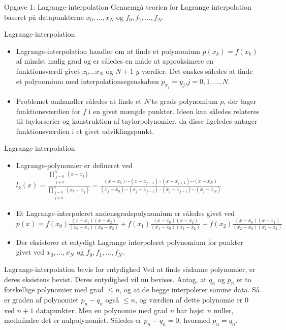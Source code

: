 \begin{frame}{Opgave 1: Lagrange-interpolation}
    Gennemgå teorien for Lagrange interpolation baseret på datapunkterne $x_0, \ldots, x_N$ og $f_0, f_1, \ldots , f_N$. 
\end{frame}

\begin{frame}{Lagrange-interpolation}
    \begin{itemize}
        \item Lagrange-interpolation handler om at finde et polynomium $p(x_k)=f(x_k)$ af mindst mulig grad og er således en måde at approksimere en funktionsværdi givet $x_0 \ldots x_N$ og $N+1 $  $y$ værdier.
        Det ønskes således at finde et polynomium med interpolationsegenskaben $p_{x_j}=y_j$,$j=0,1,\ldots,N$.

        \item Problemet omhandler således at finde et $N$'te grads polynomium $p$, der tager funktionsværdien for $f$ i en givet mængde punkter. 
        Ideen kan således relateres til taylorserier og konstruktion af taylorpolynomier, da disse ligeledes antager funktionsværdien i et givet udviklingspunkt.
    \end{itemize}
\end{frame}
\begin{frame}{Lagrange-interpolation}
    \begin{itemize}
        \item Lagrange-polynomier er defineret ved \\
            $
            l_k(x)=\frac{\prod_{\substack{j=0 \\ {j \neq k}}}^{N}(x-x_j)}{\prod_{\substack{j=0 \\ {j \neq k}}}^{N}(x_k-x_j)}=\frac{(x-x_0) \cdots (x-x_{j-1}) \cdot (x-x_{j+1})\cdots(x-x_N)}{(x_j-x_0)\cdots (x_j-x_{j-1}) \cdot (x_j-x_{j+1})\cdots (x_j - x_N)}
            $
        \item Et Lagrange-interpoleret andensgradspolynomium er således givet ved $ p(x)=f(x_0)\frac{(x-x_1)(x-x_2)}{(x_0-x_1)(x_0-x_2)}+f(x_1)\frac{(x-x_0)(x-x_2)}{(x_1-x_0)(x_1-x_2)}+f(x_2)\frac{(x-x_0)(x-x_1)}{(x_2-x_0)(x_2-x_1)} $
        \item Der eksisterer et entydigt Lagrange interpoleret polynomium for punkter givet ved $x_0, \ldots, x_N$ og $f_0, f_1, \ldots , f_N$.
        
    \end{itemize}
\end{frame}
\begin{frame}{Lagrange-interpolation bevis for entydighed}
    Ved at finde sådanne polynomier, er deres eksistens bevist. 
    Deres entydighed vil nu bevises. 
    Antag, at $q_n$ og $p_n$ er to forskellige polynomier med grad $\leq n$, og at de begge interpolerer samme data. 
    Så er graden af polynomiet $p_n - q_n$ også $\leq n$, og værdien af dette polynomie er $0$ ved $n+1$ datapunkter. 
    Men en polynomie med grad $n$ har højst $n$ nuller, medmindre det er nulpolynomiet. 
    Således er $p_n - q_n = 0$, hvormed $p_n = q_n$. 
\end{frame}

